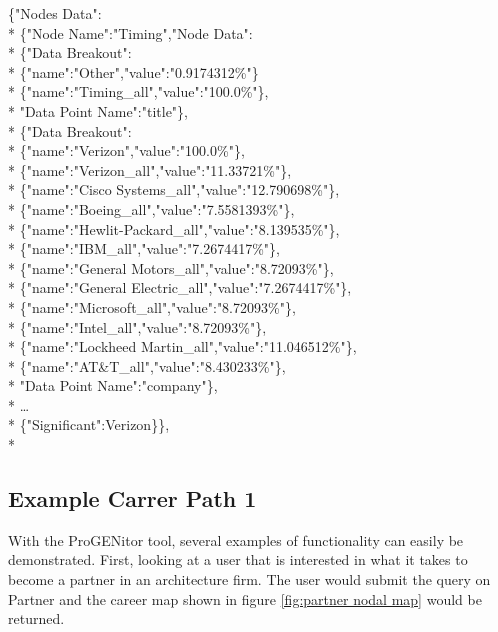 \pagebreak
\begin{tt}
\begin{footnotesize}
\noindent \{"Nodes Data":\\*
	\indent \{"Node Name":"Timing","Node Data":\\*
		\indent \{"Data Breakout":\\*
		\indent \indent	\{"name":"Other","value":"0.9174312\%"\}\\*
		\indent	\indent \{"name":"Timing\_all","value":"100.0\%"\},\\*
		\indent	"Data Point Name":"title"\},\\*
		\indent\{"Data Breakout":\\*
		\indent	\indent	\{"name":"Verizon","value":"100.0\%"\},\\*
		\indent	\indent	\{"name":"Verizon\_all","value":"11.33721\%"\},\\*
		\indent	\indent	\{"name":"Cisco Systems\_all","value":"12.790698\%"\},\\*
		\indent	\indent	\{"name":"Boeing\_all","value":"7.5581393\%"\},\\*
		\indent	\indent	\{"name":"Hewlit-Packard\_all","value":"8.139535\%"\},\\*
		\indent	\indent	\{"name":"IBM\_all","value":"7.2674417\%"\},\\*
		\indent	\indent	\{"name":"General Motors\_all","value":"8.72093\%"\},\\*
		\indent	\indent	\{"name":"General Electric\_all","value":"7.2674417\%"\},\\*
		\indent	\indent	\{"name":"Microsoft\_all","value":"8.72093\%"\},\\*
		\indent	\indent	\{"name":"Intel\_all","value":"8.72093\%"\},\\*
		\indent	\indent	\{"name":"Lockheed Martin\_all","value":"11.046512\%"\},\\*
		\indent	\indent	\{"name":"AT\&T\_all","value":"8.430233\%"\},\\*
		\indent"Data Point Name":"company"\},\\*
		\indent\ldots\\*
		\indent \{"Significant":Verizon\}\},\\*
\end{footnotesize}
\end{tt}

\subsection{Example Carrer Path 1}
With the ProGENitor tool, several examples of functionality can easily be
demonstrated.  First, looking at a user that is interested in what it takes to
become a partner in an architecture firm.  The user would submit the query on
Partner and the career map shown in figure \ref{fig:partner nodal map} would be
returned.

